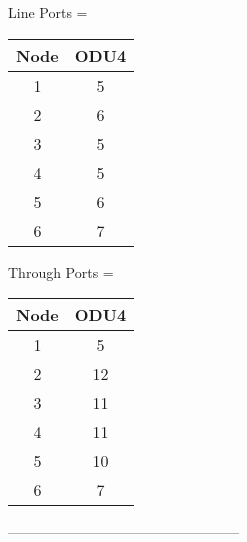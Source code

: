 Line Ports =\\


\begin{tabular}{|c|c|}
  \hline
  Node & ODU4 \\
  \hline\hline
  1 & 5 \\
  2 & 6 \\
  3 & 5 \\
  4 & 5 \\
  5 & 6 \\
  6 & 7 \\
  \hline
\end{tabular}

\vspace{11pt}

Through Ports = \\


\begin{tabular}{|c|c|}
  \hline
  Node & ODU4 \\
  \hline\hline
  1 & 5 \\
  2 & 12 \\
  3 & 11 \\
  4 & 11 \\
  5 & 10 \\
  6 & 7 \\
  \hline
\end{tabular}

\vspace{11pt}

-------------------------------------------------- \\

